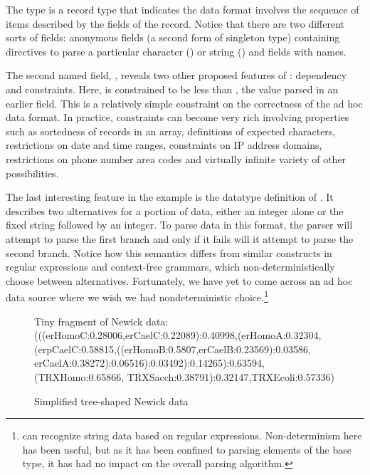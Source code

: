 The type  is a record type that indicates the data
format involves the sequence of items described by the fields of the
record.  Notice that there are two different sorts of fields:
anonymous fields (a second form of singleton type) containing
directives to parse a particular character () or string
() and fields with names.

The second named field, , reveals two other
proposed features of \padsml: dependency and constraints.  Here,
 is constrained to be less than ,
the value parsed in an earlier field.  This is a relatively simple
constraint on the correctness of the ad hoc data format.  In practice,
constraints can become very rich involving properties such as
sortedness of records in an array, definitions of expected characters,
restrictions on date and time ranges, constraints on IP address
domains, restrictions on phone number area codes and virtually
infinite variety of other possibilities.

The last interesting feature in the \dibbler{} example is the datatype
definition of .  It describes two alternatives for a
portion of data, either an integer alone or the fixed string
 followed by an integer.  To parse data in this format,
the parser will attempt to parse the first branch and only if it fails
will it attempt to parse the second branch.  Notice how this semantics
differs from similar constructs in regular expressions and
context-free grammars, which non-deterministically choose between
alternatives.  Fortunately, we have yet to come across an ad hoc data
source where we wish we had nondeterministic choice.\footnote{\pads{}
  can recognize string data based on regular expressions.
  Non-determinism here has been useful, but as it has been confined to
  parsing elements of the  base type, it has had no impact
  on the overall parsing algorithm.}

\begin{figure}
  \begin{code}

\mbox{}
{\rm Tiny fragment of Newick data:} 
\mbox{}
(((erHomoC:0.28006,erCaelC:0.22089):0.40998,(erHomoA:0.32304,
(erpCaelC:0.58815,((erHomoB:0.5807,erCaelB:0.23569):0.03586,
erCaelA:0.38272):0.06516):0.03492):0.14265):0.63594,(TRXHomo:0.65866,
TRXSacch:0.38791):0.32147,TRXEcoli:0.57336)
  \end{code}
  \caption{Simplified tree-shaped Newick data}
  \label{fig:newick}
\end{figure}

